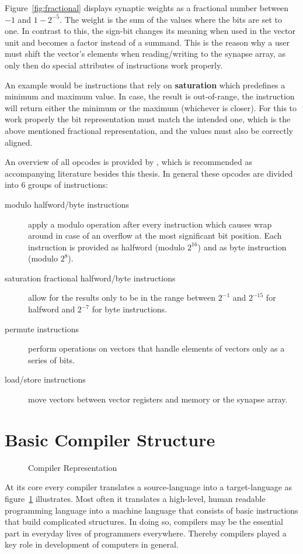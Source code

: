 {Figure~\ref{fig:fractional} displays synaptic weights as a fractional number between $-1$ and $1-2^{-5}$.
The weight is the sum of the values where the bits are set to one.
In contrast to this, the sign-bit changes its meaning when used in the vector unit and becomes a factor instead of a summand.
This is the reason why a user must shift the vector's elements when reading/writing to the synapse array, as only then do special attributes of instructions work properly.

An example would be instructions that rely on \textbf{saturation} which predefines a minimum and maximum value.
In case, the result is out-of-range, the instruction will return either the minimum or the maximum (whichever is closer).
For this to work properly the bit representation must match the intended one, which is the above mentioned fractional representation, and the values must also be correctly aligned.

An overview of all opcodes is provided by \cite{nuxmanual}, which is recommended as accompanying literature besides this thesis.
In general these opcodes are divided into 6 groups of instructions:
\begin{description}
    \item[modulo halfword/byte instructions] apply a modulo operation after every instruction which causes wrap around in case of an overflow at the most significant bit position.
        Each instruction is provided as halfword (modulo $2^{16}$) and as byte instruction (modulo $2^{8}$).
    \item[saturation fractional halfword/byte instructions] allow for the results only to be in the range between $2^{-1}$ and $2^{-15}$ for halfword and $2^{-7}$ for byte instructions.
    \item[permute instructions] perform operations on vectors that handle elements of vectors only as a series of bits.
    \item[load/store instructions] move vectors between vector registers and memory or the synapse array.
\end{description}


\section{Basic Compiler Structure}
\label{section:compiler}

\begin{figure}
\captionsetup{format=plain, indention=.6cm, labelsep=newline,singlelinecheck=false}
    \centering
        
        \caption{\label{fig:compiler} Compiler Representation}
\end{figure}
At its core every compiler translates a source-language into a target-language as figure~\ref{fig:compiler} illustrates.
Most often it translates a high-level, human readable programming language into a machine language that consists of basic instructions that build complicated structures.
In doing so, compilers may be the essential part in everyday lives of programmers everywhere.
Thereby compilers played a key role in development of computers in general.

}

